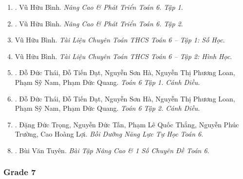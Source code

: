 \documentclass{article}
\begin{document}
\begin{enumerate}
	\item \cite{Binh_Toan_6_tap_1}. Vũ Hữu Bình. \textit{Nâng Cao \& Phát Triển Toán 6. Tập 1}.\hfill{}
	\item \cite{Binh_Toan_6_tap_2}. Vũ Hữu Bình. \textit{Nâng Cao \& Phát Triển Toán 6. Tập 2}.\hfill{}
	\item Vũ Hữu Bình. \textit{Tài Liệu Chuyên Toán THCS Toán 6 -- Tập 1: Số Học}.
	\item Vũ Hữu Bình. \textit{Tài Liệu Chuyên Toán THCS Toán 6 -- Tập 2: Hình Học}.
	\item \cite{SGK_Toan_6_Canh_Dieu_tap_1}. Đỗ Đức Thái, Đỗ Tiến Đạt, Nguyễn Sơn Hà, Nguyễn Thị Phương Loan, Phạm Sỹ Nam, Phạm Đức Quang. \textit{Toán 6 Tập 1. Cánh Diều}.\hfill{}
	\item \cite{SGK_Toan_6_Canh_Dieu_tap_2}. Đỗ Đức Thái, Đỗ Tiến Đạt, Nguyễn Sơn Hà, Nguyễn Thị Phương Loan, Phạm Sỹ Nam, Phạm Đức Quang. \textit{Toán 6 Tập 2. Cánh Diều}.\hfill{}
	\item \cite{Trong_Toan_6_2021}. Đặng Đức Trọng, Nguyễn Đức Tấn, Phạm Lê Quốc Thắng, Nguyễn Phúc Trường, Cao Hoàng Lợi. \textit{Bồi Dưỡng Năng Lực Tự Học Toán 6}.\hfill{\sf[bought]}
	\item \cite{Tuyen_Toan_6}. Bùi Văn Tuyên. \textit{Bài Tập Nâng Cao \& 1 Số Chuyên Đề Toán 6}.\hfill{\sf[bought]}
\end{enumerate}

\subsubsection{Grade 7}
	
\end{document}
